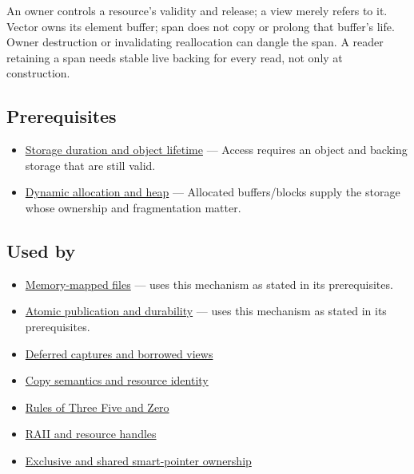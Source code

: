 An owner controls a resource's validity and release; a view merely refers to it. Vector owns its element buffer; span does not copy or prolong that buffer's life. Owner destruction or invalidating reallocation can dangle the span. A reader retaining a span needs stable live backing for every read, not only at construction.

\subsection{Prerequisites}\label{appendix-d52e4486f527-prerequisites}

\hypertarget{appendix-d52e4486f527-prerequisites}{}

\begin{itemize}
\tightlist
\item
  \hyperref[appendix-0b104bcba06b]{Storage duration and object lifetime} --- Access requires an object and backing storage that are still valid.
\item
  \hyperref[appendix-c3480f7d9ff3]{Dynamic allocation and heap} --- Allocated buffers/blocks supply the storage whose ownership and fragmentation matter.
\end{itemize}

\subsection{Used by}\label{appendix-d52e4486f527-used-by}

\hypertarget{appendix-d52e4486f527-used-by}{}

\begin{itemize}
\tightlist
\item
  \hyperref[appendix-313ee7a0ba7b]{Memory-mapped files} --- uses this mechanism as stated in its prerequisites.
\item
  \hyperref[appendix-e89a8f290ef5]{Atomic publication and durability} --- uses this mechanism as stated in its prerequisites.
\item
  \hyperref[appendix-aea529eb5175]{Deferred captures and borrowed views}
\item
  \hyperref[appendix-1340cd1ce582]{Copy semantics and resource identity}
\item
  \hyperref[appendix-7679107d057e]{Rules of Three Five and Zero}
\item
  \hyperref[appendix-69739d3ab49b]{RAII and resource handles}
\item
  \hyperref[appendix-51602cabe815]{Exclusive and shared smart-pointer ownership}
\end{itemize}

